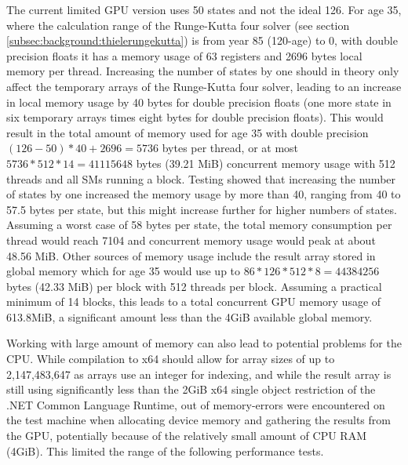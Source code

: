 The current limited GPU version uses 50 states and not the ideal 126.
For age 35, where the calculation range of the Runge-Kutta four solver (see section \ref{subsec:background:thielerungekutta}) is from year 85 (120-age) to 0, with double precision floats it has a memory usage of 63 registers and 2696 bytes local memory per thread.
Increasing the number of states by one should in theory only affect the temporary arrays of the Runge-Kutta four solver, leading to an increase in local memory usage by 40 bytes for double precision floats (one more state in six temporary arrays times eight bytes for double precision floats).
This would result in the total amount of memory used for age 35 with double precision $(126 - 50) * 40 + 2696 = 5736$ bytes per thread, or at most $5736 * 512 * 14 = 41115648$ bytes (39.21 MiB) concurrent memory usage with 512 threads and all SMs running a block.
Testing showed that increasing the number of states by one increased the memory usage by more than 40, ranging from 40 to 57.5 bytes per state, but this might increase further for higher numbers of states.
Assuming a worst case of 58 bytes per state, the total memory consumption per thread would reach 7104 and concurrent memory usage would peak at about 48.56 MiB.
Other sources of memory usage include the result array stored in global memory which for age 35 would use up to $86 * 126 * 512 * 8 = 44384256$ bytes (42.33 MiB) per block with 512 threads per block.
Assuming a practical minimum of 14 blocks, this leads to a total concurrent GPU memory usage of 613.8MiB, a significant amount less than the 4GiB available global memory.

Working with large amount of memory can also lead to potential problems for the CPU.
While compilation to x64 should allow for array sizes of up to 2,147,483,647 as arrays use an integer for indexing, and while the result array is still using significantly less than the 2GiB x64 single object restriction of the .NET Common Language Runtime, out of memory-errors were encountered on the test machine when allocating device memory and gathering the results from the GPU, potentially because of the relatively small amount of CPU RAM (4GiB).
This limited the range of the following performance tests.

